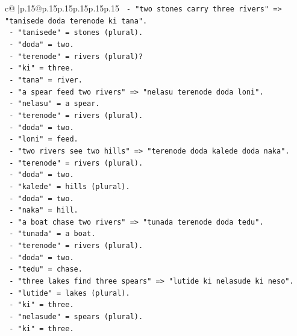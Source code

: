 \documentclass{article}
\begin{document}
{\begin{supertabular}{c@{$\;$}|p{.15\linewidth}@{}p{.15\linewidth}p{.15\linewidth}p{.15\linewidth}p{.15\linewidth}p{.15\linewidth}}
{{{\texttt{             {-} "two stones carry three rivers" => "tanisede doda terenode ki tana".} \\
\texttt{               {-} "tanisede" = stones (plural).} \\
\texttt{               {-} "doda" = two.} \\
\texttt{               {-} "terenode" = rivers (plural)?} \\
\texttt{               {-} "ki" = three.} \\
\texttt{               {-} "tana" = river.} \\
\texttt{             {-} "a spear feed two rivers" => "nelasu terenode doda loni".} \\
\texttt{               {-} "nelasu" = a spear.} \\
\texttt{               {-} "terenode" = rivers (plural).} \\
\texttt{               {-} "doda" = two.} \\
\texttt{               {-} "loni" = feed.} \\
\texttt{             {-} "two rivers see two hills" => "terenode doda kalede doda naka".} \\
\texttt{               {-} "terenode" = rivers (plural).} \\
\texttt{               {-} "doda" = two.} \\
\texttt{               {-} "kalede" = hills (plural).} \\
\texttt{               {-} "doda" = two.} \\
\texttt{               {-} "naka" = hill.} \\
\texttt{             {-} "a boat chase two rivers" => "tunada terenode doda tedu".} \\
\texttt{               {-} "tunada" = a boat.} \\
\texttt{               {-} "terenode" = rivers (plural).} \\
\texttt{               {-} "doda" = two.} \\
\texttt{               {-} "tedu" = chase.} \\
\texttt{             {-} "three lakes find three spears" => "lutide ki nelasude ki neso".} \\
\texttt{               {-} "lutide" = lakes (plural).} \\
\texttt{               {-} "ki" = three.} \\
\texttt{               {-} "nelasude" = spears (plural).} \\
\texttt{               {-} "ki" = three.} \\
}}}
\end{supertabular}}
\end{document}
